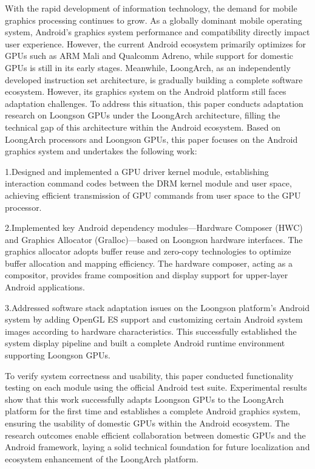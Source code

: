 \begin{abstract*}
  With the rapid development of information technology, the demand for mobile graphics processing continues to grow. 
  As a globally dominant mobile operating system, 
  Android's graphics system performance and compatibility directly impact user experience.
  However, the current Android ecosystem primarily optimizes for GPUs such as ARM Mali and Qualcomm Adreno, 
  while support for domestic GPUs is still in its early stages. 
  Meanwhile, LoongArch, as an independently developed instruction set architecture, 
  is gradually building a complete software ecosystem. 
  However, its graphics system on the Android platform still faces adaptation challenges.
  To address this situation, this paper conducts adaptation research on Loongson GPUs under the LoongArch architecture, 
  filling the technical gap of this architecture within the Android ecosystem.
  Based on LoongArch processors and Loongson GPUs, this paper focuses on the Android graphics system and undertakes the following work:
  
  1.Designed and implemented a GPU driver kernel module, establishing interaction command codes between the DRM kernel module and user space, 
  achieving efficient transmission of GPU commands from user space to the GPU processor.
  
  2.Implemented key Android dependency modules—Hardware Composer (HWC) and Graphics Allocator (Gralloc)—based on Loongson hardware interfaces. 
  The graphics allocator adopts buffer reuse and zero-copy technologies to optimize buffer allocation and mapping efficiency. 
  The hardware composer, acting as a compositor, provides frame composition and display support for upper-layer Android applications.
  
  3.Addressed software stack adaptation issues on the Loongson platform’s Android system by adding OpenGL ES 
  support and customizing certain Android system images according to hardware characteristics. 
  This successfully established the system display pipeline and built a complete Android runtime environment supporting Loongson GPUs.
  
  To verify system correctness and usability, 
  this paper conducted functionality testing on each module using the official Android test suite. 
  Experimental results show that this work successfully adapts Loongson GPUs to the LoongArch platform 
  for the first time and establishes a complete Android graphics system, 
  ensuring the usability of domestic GPUs within the Android ecosystem. 
  The research outcomes enable efficient collaboration between domestic GPUs and the Android framework, 
  laying a solid technical foundation for future localization and ecosystem enhancement of the LoongArch platform.
  
\end{abstract*}
